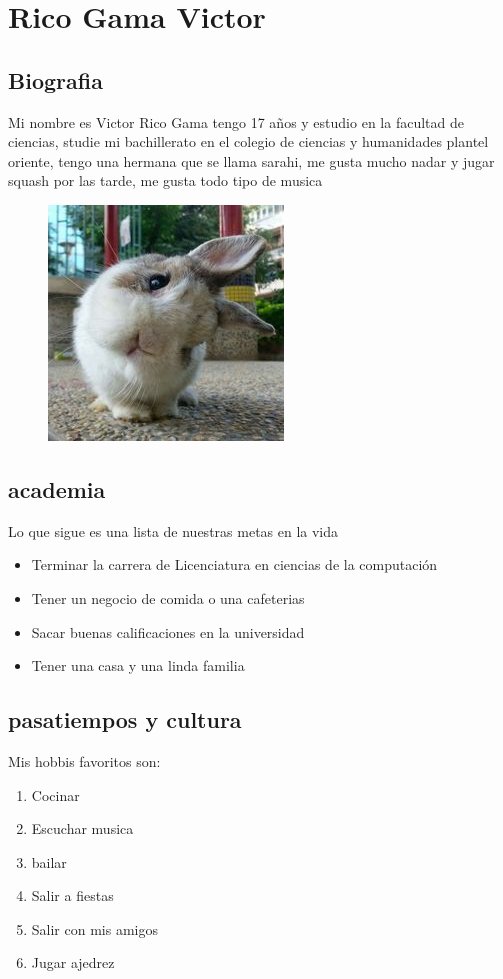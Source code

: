 \chapter{Rico Gama Victor}

\section{Biografia}
  Mi nombre es Victor Rico Gama tengo 17 años y estudio en la facultad de ciencias, studie mi bachillerato en el colegio de ciencias y humanidades plantel oriente, tengo una hermana que se llama sarahi, me gusta mucho nadar y jugar squash por las tarde, me gusta todo tipo de musica
  

\begin{figure}[h!]
  \centering
  \includegraphics[width=0.3 \textwidth]{317061143/conejito}

  
\end{figure}



\section{academia}
Lo que sigue es una lista de nuestras metas en la vida
\begin{itemize}
\item Terminar la carrera de Licenciatura en ciencias de la computación
\item Tener un negocio de comida o una cafeterias
\item Sacar buenas calificaciones en la universidad
\item Tener una casa y una linda familia
  
  
\end{itemize}

\section{pasatiempos y cultura}

Mis hobbis favoritos son:
\begin{enumerate}
\item Cocinar
\item Escuchar musica
\item bailar
\item Salir a fiestas
\item Salir con mis amigos
  \item Jugar ajedrez
  
\end{enumerate}
